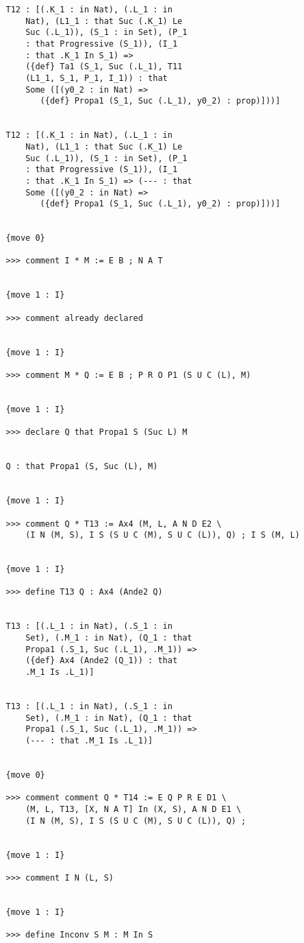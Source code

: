 \documentclass{article}
\begin{document}
\begin{verbatim}
   T12 : [(.K_1 : in Nat), (.L_1 : in 
       Nat), (L1_1 : that Suc (.K_1) Le 
       Suc (.L_1)), (S_1 : in Set), (P_1 
       : that Progressive (S_1)), (I_1 
       : that .K_1 In S_1) => 
       ({def} Ta1 (S_1, Suc (.L_1), T11 
       (L1_1, S_1, P_1, I_1)) : that 
       Some ([(y0_2 : in Nat) => 
          ({def} Propa1 (S_1, Suc (.L_1), y0_2) : prop)]))]


   T12 : [(.K_1 : in Nat), (.L_1 : in 
       Nat), (L1_1 : that Suc (.K_1) Le 
       Suc (.L_1)), (S_1 : in Set), (P_1 
       : that Progressive (S_1)), (I_1 
       : that .K_1 In S_1) => (--- : that 
       Some ([(y0_2 : in Nat) => 
          ({def} Propa1 (S_1, Suc (.L_1), y0_2) : prop)]))]


   {move 0}

   >>> comment I * M := E B ; N A T


   {move 1 : I}

   >>> comment already declared


   {move 1 : I}

   >>> comment M * Q := E B ; P R O P1 (S U C (L), M)


   {move 1 : I}

   >>> declare Q that Propa1 S (Suc L) M


   Q : that Propa1 (S, Suc (L), M)


   {move 1 : I}

   >>> comment Q * T13 := Ax4 (M, L, A N D E2 \
       (I N (M, S), I S (S U C (M), S U C (L)), Q) ; I S (M, L)


   {move 1 : I}

   >>> define T13 Q : Ax4 (Ande2 Q)


   T13 : [(.L_1 : in Nat), (.S_1 : in 
       Set), (.M_1 : in Nat), (Q_1 : that 
       Propa1 (.S_1, Suc (.L_1), .M_1)) => 
       ({def} Ax4 (Ande2 (Q_1)) : that 
       .M_1 Is .L_1)]


   T13 : [(.L_1 : in Nat), (.S_1 : in 
       Set), (.M_1 : in Nat), (Q_1 : that 
       Propa1 (.S_1, Suc (.L_1), .M_1)) => 
       (--- : that .M_1 Is .L_1)]


   {move 0}

   >>> comment comment Q * T14 := E Q P R E D1 \
       (M, L, T13, [X, N A T] In (X, S), A N D E1 \
       (I N (M, S), I S (S U C (M), S U C (L)), Q) ;


   {move 1 : I}

   >>> comment I N (L, S)


   {move 1 : I}

   >>> define Inconv S M : M In S



\end{verbatim}
\end{document}
